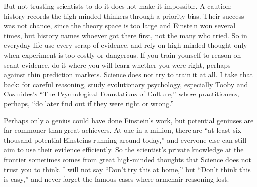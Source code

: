 But not trusting scientists to do it does not make it impossible. A caution: history records the high-minded thinkers through a priority bias. Their success was not chance, since the theory space is too large and Einstein won several times, but history names whoever got there first, not the many who tried. So in everyday life use every scrap of evidence, and rely on high-minded thought only when experiment is too costly or dangerous. If you train yourself to reason on scant evidence, do it where you will learn whether you were right, perhaps against thin prediction markets. Science does not try to train it at all. I take that back: for careful reasoning, study evolutionary psychology, especially Tooby and Cosmides's ``The Psychological Foundations of Culture,'' whose practitioners, perhaps, ``do later find out if they were right or wrong.'' 

Perhaps only a genius could have done Einstein's work, but potential geniuses are far commoner than great achievers. At one in a million, there are ``at least six thousand potential Einsteins running around today,'' and everyone else can still aim to use their evidence efficiently. So the scientist's private knowledge at the frontier sometimes comes from great high-minded thoughts that Science does not trust you to think. I will not say ``Don't try this at home,'' but ``Don't think this is easy,'' and never forget the famous cases where armchair reasoning lost.
